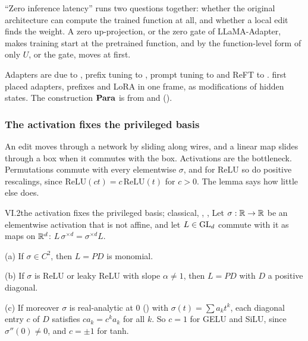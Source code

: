 \begin{explains}
``Zero inference latency'' runs two questions together: whether the original architecture can compute the trained
function at all, and whether a local edit finds the weight. A zero up-projection, or the zero gate of LLaMA-Adapter,
makes training start at the pretrained function, and by the function-level form of  only $U$, or the
gate, moves at first.
\end{explains}

Adapters are due to \citet{houlsby2019parameter}, prefix tuning to \citet{li2021prefix}, prompt tuning to
\citet{lester2021power} and ReFT to \citet{wu2024reft}. \citet{he2021unified} first placed adapters, prefixes and LoRA in
one frame, as modifications of hidden states. The construction $\mathbf{Para}$ is from \citet{fong2017backprop} and
\citet{cruttwell2021categorical} ().

\subsubsection{The activation fixes the privileged basis}\label{sec:merge-basis}

An edit moves through a network by sliding along wires, and a linear map slides through a box when it commutes with the
box. Activations are the bottleneck. Permutations commute with every elementwise $\sigma$, and for ReLU so do positive
rescalings, since $\mathrm{ReLU}(ct)=c\,\mathrm{ReLU}(t)$ for $c>0$. The lemma says how little else does.

\begin{lemma}{VI.2}{the activation fixes the privileged basis; classical, \citet{xsussmann1992uniqueness},
\citet{xchen1993geometry}, \citet{xgodfrey2022symmetries}}
Let $\sigma:\mathbb{R}\to\mathbb{R}$ be an elementwise activation that is not affine, and let $L\in\mathrm{GL}_d$ commute with it as maps on
$\mathbb{R}^d$: $L\,\sigma^{\times d}=\sigma^{\times d}L$.

(a) If $\sigma\in C^2$, then $L=PD$ is monomial.

(b) If $\sigma$ is ReLU or leaky ReLU with slope $\alpha\ne1$, then $L=PD$ with $D$ a positive diagonal.

(c) If moreover $\sigma$ is real-analytic at $0$ () with $\sigma(t)=\sum a_kt^k$, each diagonal entry $c$ of
$D$ satisfies $ca_k=c^ka_k$ for all $k$. So $c=1$ for GELU and SiLU, since $\sigma''(0)\neq0$, and $c=\pm1$ for tanh.
\end{lemma}

